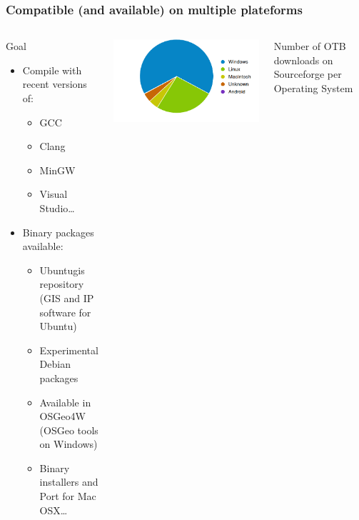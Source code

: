 \documentclass[8pt]{beamer}
\begin{document}
\begin{frame}
\frametitle{Compatible (and available) on multiple plateforms}
\begin{columns}
\begin{block}{Goal}
\begin{itemize}
\item Compile with recent versions of:
\begin{itemize}
\item GCC
\item Clang
\item MinGW
\item Visual Studio\ldots
\end{itemize}
\item Binary packages available:
\begin{itemize}
\item Ubuntugis repository (GIS and IP software for Ubuntu)
\item Experimental Debian packages 
\item Available in  OSGeo4W (OSGeo tools on Windows)
\item Binary installers and Port for Mac OSX\ldots
\end{itemize}
\end{itemize}
\end{block}
\includegraphics[width=\textwidth]{images/OTB4_download_sourceforge_os_crop.png}
\begin{center}
\tiny{Number of OTB downloads on Sourceforge per Operating System}
\end{center}
\end{columns}
\end{frame}
\end{document}
